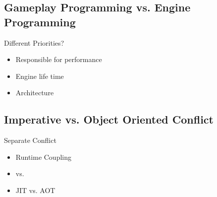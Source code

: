 \subsection{Gameplay Programming vs. Engine Programming}
\begin{frame}{\secname}{\subsecname}
	Different Priorities?
	\begin{itemize}
		\item<2-> Responsible for performance
		\item<3-> Engine life time
		\item<4-> Architecture
	\end{itemize}
\end{frame}

\subsection{Imperative vs. Object Oriented Conflict}
\begin{frame}{\secname}{\subsecname}
	Separate Conflict
	\begin{itemize}
		\item<2-> Runtime Coupling
		\item<3-> \cpp vs. \cs
		\item<4-> JIT vs. AOT
	\end{itemize}
\end{frame}

